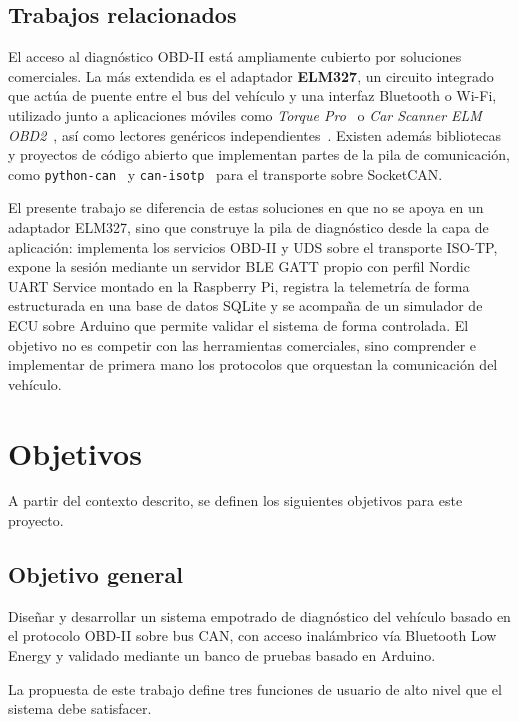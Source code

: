 \subsection{Trabajos relacionados}
\label{sec:trabajos_relacionados}

El acceso al diagnóstico OBD-II está ampliamente cubierto por soluciones comerciales. La más extendida es el adaptador \textbf{ELM327}, un circuito integrado que actúa de puente entre el bus del vehículo y una interfaz Bluetooth o Wi-Fi, utilizado junto a aplicaciones móviles como \textit{Torque Pro}~\cite{Torque_Pro} o \textit{Car Scanner ELM OBD2}~\cite{CarScanner_app}, así como lectores genéricos independientes~\cite{KONWEII_scanner}. Existen además bibliotecas y proyectos de código abierto que implementan partes de la pila de comunicación, como \texttt{python-can}~\cite{Twiss23-pythoncan} y \texttt{can-isotp}~\cite{Menager23-isotp} para el transporte sobre SocketCAN.

El presente trabajo se diferencia de estas soluciones en que no se apoya en un adaptador ELM327, sino que construye la pila de diagnóstico desde la capa de aplicación: implementa los servicios OBD-II y UDS sobre el transporte ISO-TP, expone la sesión mediante un servidor BLE GATT propio con perfil Nordic UART Service montado en la Raspberry Pi, registra la telemetría de forma estructurada en una base de datos SQLite y se acompaña de un simulador de ECU sobre Arduino que permite validar el sistema de forma controlada. El objetivo no es competir con las herramientas comerciales, sino comprender e implementar de primera mano los protocolos que orquestan la comunicación del vehículo.

\section{Objetivos}
\label{sec:objetivos}

A partir del contexto descrito, se definen los siguientes objetivos para este proyecto.

\subsection{Objetivo general}

Diseñar y desarrollar un sistema empotrado de diagnóstico del vehículo basado en el protocolo OBD-II sobre bus CAN, con acceso inalámbrico vía Bluetooth Low Energy y validado mediante un banco de pruebas basado en Arduino.

La propuesta de este trabajo define tres funciones de usuario de alto nivel que el sistema debe satisfacer.

